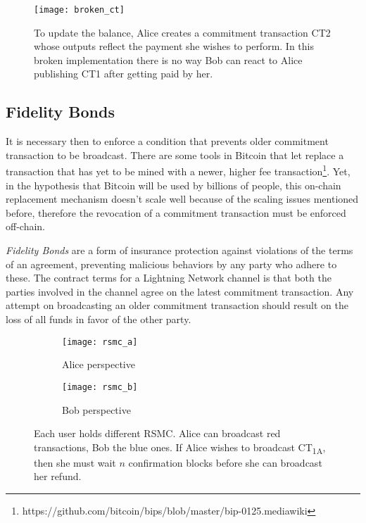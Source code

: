 		\begin{figure}
			\texttt{[image: broken\_ct]}
			\centering
			\caption{To update the balance, Alice creates a commitment transaction CT2 whose outputs reflect the payment she wishes to perform. In this broken implementation there is no way Bob can react to Alice publishing CT1 after getting paid by her.}
		\end{figure}
		
		\subsection{Fidelity Bonds}
		
		It is necessary then to enforce a condition that prevents older commitment transaction to be broadcast. There are some tools in Bitcoin that let replace a transaction that has yet to be mined with a newer, higher fee transaction\footnote{https://github.com/bitcoin/bips/blob/master/bip-0125.mediawiki}. Yet, in the hypothesis that Bitcoin will be used by billions of people, this on-chain replacement mechanism doesn't scale well because of the scaling issues mentioned before, therefore the revocation of a commitment transaction must be enforced off-chain.
		
		\textit{Fidelity Bonds} are a form of insurance protection against violations of the terms of an agreement, preventing malicious behaviors by any party who adhere to these. The contract terms for a Lightning Network channel is that both the parties involved in the channel agree on the latest commitment transaction. Any attempt on broadcasting an older commitment transaction should result on the loss of all funds in favor of the other party. 
		
		\begin{figure}
			\centering
			\begin{subfigure}{0.4\textwidth}
				\centering
				\texttt{[image: rsmc\_a]}
				\caption{Alice perspective}
			\end{subfigure}
			\begin{subfigure}{0.4\textwidth}	
				\centering
				\texttt{[image: rsmc\_b]}
				\caption{Bob perspective}
			\end{subfigure}
			\caption{Each user holds different RSMC. Alice can broadcast red transactions, Bob the blue ones. If Alice wishes to broadcast CT\textsubscript{1A}, then she must wait \(n\) confirmation blocks before she can broadcast her refund.}
			\label{rsmc}
		\end{figure}
		
